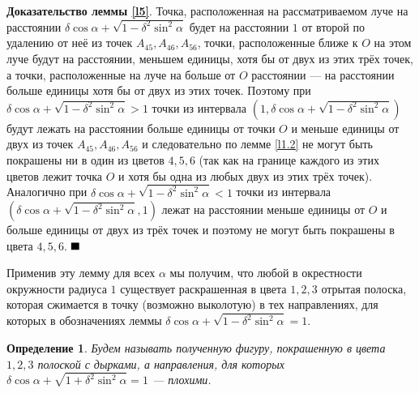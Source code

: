 \documentclass[12pt,a4paper]{article}
\newtheorem{mydef}{Определение}
\renewcommand{\qed}{$\blacksquare \vspace{5mm}$}
\begin{document}
\textbf{Доказательство леммы \ref{l5}}. Точка, расположенная на рассматриваемом луче на расстоянии $\delta \cos \alpha + \sqrt{1 - \delta^2 \sin^2\alpha}$ будет на расстоянии $1$ от второй по удалению от неё из точек $A_{45}, A_{46}, A_{56}$, точки, расположенные ближе к $O$ на этом луче будут на расстоянии, меньшем единицы, хотя бы от двух из этих трёх точек, а точки, расположенные на луче на больше от $O$ расстоянии --- на расстоянии больше единицы хотя бы от двух из этих точек. Поэтому при $\delta \cos \alpha + \sqrt{1 - \delta^2 \sin^2\alpha} > 1$ точки из интервала  $(1,\delta \cos \alpha + \sqrt{1 - \delta^2 \sin^2\alpha})$ будут лежать на расстоянии больше единицы от точки $O$ и меньше единицы от двух из точек $A_{45}, A_{46}, A_{56}$ и следовательно по лемме \ref{l1.2} не могут быть покрашены ни в один из цветов $4, 5, 6$ (так как на границе каждого из этих цветов лежит точка $O$ и хотя бы одна из любых двух из этих трёх точек). Аналогично при  $\delta \cos \alpha + \sqrt{1 - \delta^2 \sin^2\alpha} < 1$ точки из интервала  $(\delta \cos \alpha + \sqrt{1 - \delta^2 \sin^2\alpha}, 1)$ лежат на расстоянии меньше единицы от $O$ и больше единицы от двух из трёх точек и поэтому не могут быть покрашены в цвета $4, 5, 6$. \qed

\begin{figure}
    \centering
    
    \label{fig:enter-label}
\end{figure}


Применив эту лемму для всех $\alpha$ мы получим, что любой в окрестности окружности радиуса $1$ существует раскрашенная в цвета $1, 2, 3$ отрытая полоска, которая сжимается в точку (возможно выколотую) в тех направлениях, для которых в обозначениях леммы $\delta \cos \alpha + \sqrt{1 - \delta^2 \sin^2\alpha} = 1$.

\begin{mydef}
	Будем называть полученную фигуру, покрашенную в цвета $1, 2, 3$ полоской с дырками, а направления, для которых $\delta \cos \alpha + \sqrt{1 + \delta^2 \sin^2\alpha} = 1$ --- плохими.
\end{mydef}


\end{document}
